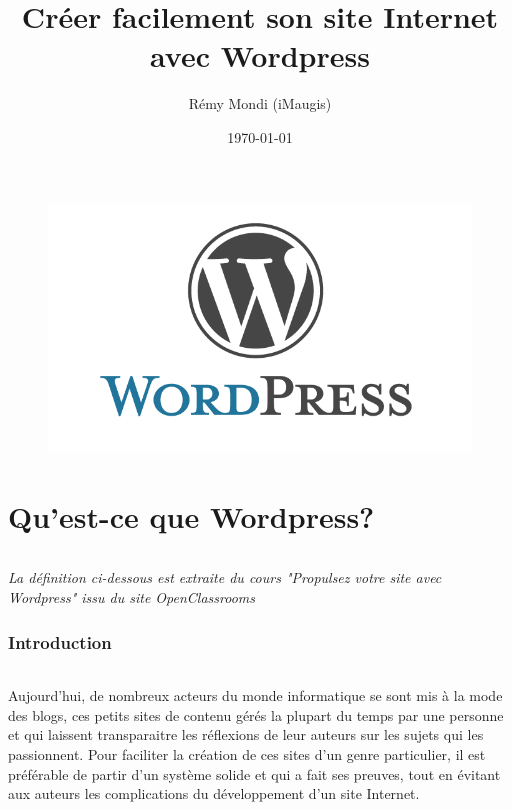 \documentclass[10pt,a4paper]{article}
\title{Créer facilement son site Internet avec Wordpress}
\author{Rémy Mondi (iMaugis)}
\date{\today}
\begin{document}
\maketitle
\begin{figure}[!h]
\begin{center}
\includegraphics[scale=0.5]{img/logo-wordpress.png}
\end{center}
\end{figure}
\newpage

\tableofcontents
\newpage

\part{Qu'est-ce que Wordpress?}
\newpage
\paragraph{} \begin{center}\textit{La définition ci-dessous est extraite du cours "Propulsez votre site avec Wordpress" issu du site OpenClassrooms}\end{center}
\section{Introduction}
\paragraph{}Aujourd'hui, de nombreux acteurs du monde informatique se sont mis à la mode des blogs, ces petits sites de contenu gérés la plupart du temps par une personne et qui laissent transparaitre les réflexions de leur auteurs sur les sujets qui les passionnent. Pour faciliter la création de ces sites d'un genre particulier, il est préférable de partir d'un système solide et qui a fait ses preuves, tout en évitant aux auteurs les complications du développement d'un site Internet.
\end{document}
